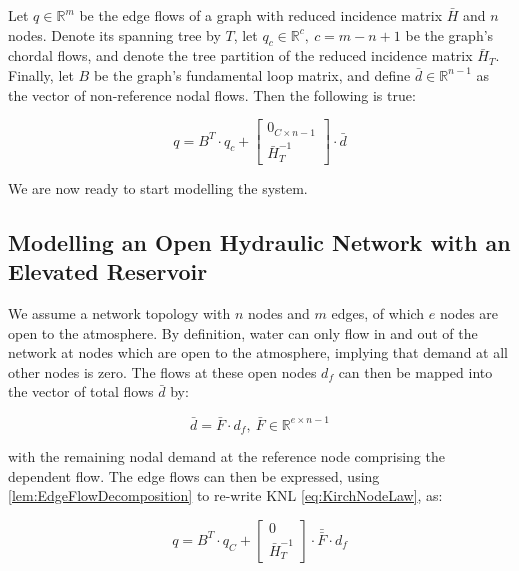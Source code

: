 \begin{lemma}\label{lem:EdgeFlowDecomposition}
	Let $q \in \mathbb{R}^m$ be the edge flows of a graph with reduced incidence matrix $\bar{H}$ and $n$ nodes. Denote its spanning tree by $T$, let $q_c \in \mathbb{R}^c, \ c = m-n+1$ be the graph's chordal flows, and denote the tree partition of the reduced incidence matrix $\bar{H}_T$. Finally, let $B$ be the graph's fundamental loop matrix, and define $\bar{d} \in \mathbb{R}^{n-1}$ as the vector of non-reference nodal flows. Then the following is true:
	
	\begin{equation}\label{eq:EdgeFlowDecomposition}
		q = B^T\cdot q_c +
		\begin{bmatrix}
			0_{C \times n-1} \\ \bar{H}_T^{-1} 
		\end{bmatrix}
		\cdot \bar{d}
	\end{equation}
\end{lemma}

We are now ready to start modelling the system.

\subsection{Modelling an Open Hydraulic Network with an Elevated Reservoir}\label{subsec:ModelWithTank}

We assume a network topology with $n$ nodes and $m$ edges, of which $e$ nodes are open to the atmosphere. By definition, water can only flow in and out of the network at nodes which are open to the atmosphere, implying that demand at all other nodes is zero. The flows at these open nodes $d_f$ can then be mapped into the vector of total flows $\bar{d}$ by:

\begin{equation}\label{eq:IndependentFlows}
	\bar{d} = \bar{F}\cdot d_f, \ \bar{F} \in \mathbb{R}^{e \times n-1}
\end{equation}

with the remaining nodal demand at the reference node comprising the dependent flow. The edge flows can then be expressed, using \cref{lem:EdgeFlowDecomposition} to re-write KNL \cref{eq:KirchNodeLaw}, as:

\begin{equation}\label{eq:EdgeFlows}
	q = B^T\cdot q_C +
	\begin{bmatrix} 0 \\ \bar{H}_T^{-1} \end{bmatrix} \cdot \bar{\bar{F}} \cdot d_f
\end{equation}

